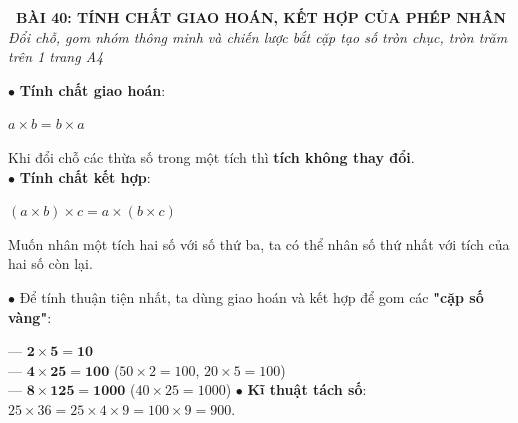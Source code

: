 \documentclass[14pt,a4paper,oneside]{extbook}
\begin{document}
\noindent
\begin{tcolorbox}[
  enhanced,
  colback=teal!8!white,
  colframe=teal!80!black,
  arc=3mm, boxrule=1pt,
  left=3mm, right=3mm, top=2mm, bottom=2mm,
  halign=center
]
  {\Large\bfseries\color{teal!90!black}\faBookmark\ BÀI 40: TÍNH CHẤT GIAO HOÁN, KẾT HỢP CỦA PHÉP NHÂN}\\[1.5pt]
  {\footnotesize\itshape\color{black!75} Đổi chỗ, gom nhóm thông minh và chiến lược bắt cặp tạo số tròn chục, tròn trăm trên 1 trang A4}
\end{tcolorbox}

\vspace{2mm}

\noindent
\begin{minipage}[t]{0.49\textwidth}
  \begin{tcolorbox}[
    enhanced,
    title={\footnotesize\bfseries\color{white}\faExchange\ 1. Hai tính chất nền tảng},
    colback=blue!2!white,
    colframe=blue!75!black,
    arc=2.5mm, boxrule=0.8pt, top=1.8mm, bottom=1.8mm, left=2mm, right=2mm
  ]
    \footnotesize
    $\bullet$ \textbf{Tính chất giao hoán}:
    \begin{center}
      $a \times b = b \times a$
    \end{center}
    Khi đổi chỗ các thừa số trong một tích thì \textbf{tích không thay đổi}.\\
    $\bullet$ \textbf{Tính chất kết hợp}:
    \begin{center}
      $(a \times b) \times c = a \times (b \times c)$
    \end{center}
    Muốn nhân một tích hai số với số thứ ba, ta có thể nhân số thứ nhất với tích của hai số còn lại.
  \end{tcolorbox}
\end{minipage}%
\hfill
\begin{minipage}[t]{0.49\textwidth}
  \begin{tcolorbox}[
    enhanced,
    title={\footnotesize\bfseries\color{white}\faStar\ 2. Chiến lược "Cặp số vàng"},
    colback=teal!2!white,
    colframe=teal!75!black,
    arc=2.5mm, boxrule=0.8pt, top=1.8mm, bottom=1.8mm, left=2mm, right=2mm
  ]
    \footnotesize
    $\bullet$ Để tính thuận tiện nhất, ta dùng giao hoán và kết hợp để gom các \textbf{"cặp số vàng"}:
    \par
    --- $\mathbf{2 \times 5 = 10}$\\
    --- $\mathbf{4 \times 25 = 100}$ \quad ($50 \times 2 = 100$, $20 \times 5 = 100$)\\
    --- $\mathbf{8 \times 125 = 1000}$ \quad ($40 \times 25 = 1000$)
    $\bullet$ \textbf{Kĩ thuật tách số}: $25 \times 36 = 25 \times 4 \times 9 = 100 \times 9 = 900$.
  \end{tcolorbox}
\end{minipage}
\end{document}
